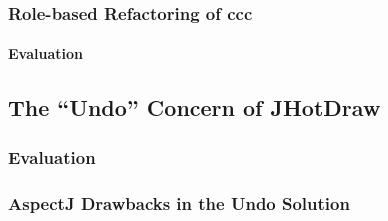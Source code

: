 \subsubsection{Role-based Refactoring of \acrlong{ccc}}

\paragraph{Evaluation}

\subsection{The ``Undo'' Concern of JHotDraw}\label{The Undo Concern of JHotDraw}

\subsubsection{Evaluation}

\subsubsection{AspectJ Drawbacks in the Undo Solution}


